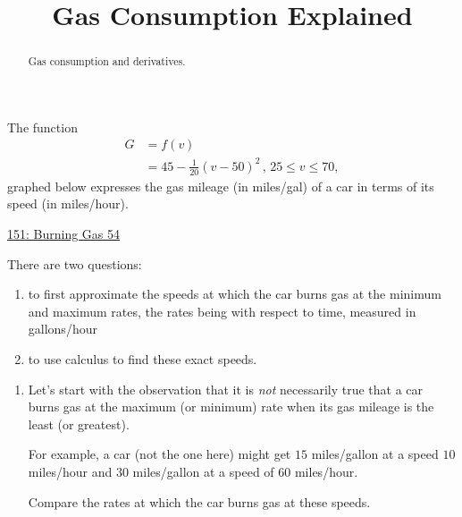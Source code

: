 \documentclass{ximera}
\title{Gas Consumption Explained}
\begin{document}
\begin{abstract}
Gas consumption and derivatives.
\end{abstract}
\maketitle




\begin{question} \label{Q5geyghhg}
The function
\begin{align*}
    G  &= f(v)    \\
         &=  45 -\frac{1}{20} \left(v-50 \right)^2 \, , \, 25\leq v \leq 70 ,
\end{align*}
graphed below expresses the gas mileage (in miles/gal) of a car in terms of its speed (in miles/hour).

\begin{onlineOnly}
    \begin{center}
\end{center}
\end{onlineOnly}

\href{https://www.desmos.com/calculator/ksjvtmbmew}{151: Burning Gas 54}

There are two questions:

\begin{enumerate}
\item to first approximate the speeds at which the car burns gas at the minimum and maximum rates, the rates being with respect to time, measured in gallons/hour

\item to use calculus to find these exact speeds.
\end{enumerate}

\begin{explanation}
\begin{enumerate}
\item Let's start with the observation that it is \emph{not} necessarily true that a car burns gas at the maximum (or minimum) rate when its gas mileage is the least (or greatest).

For example, a car (not the one here) might get $15$ miles/gallon at a speed $10$ miles/hour and $30$ miles/gallon at a speed of $60$ miles/hour.

Compare the rates at which the car burns gas at these speeds.
\begin{freeResponse}
\end{freeResponse}


\end{enumerate}
\end{explanation}
\end{question}
\end{document}

